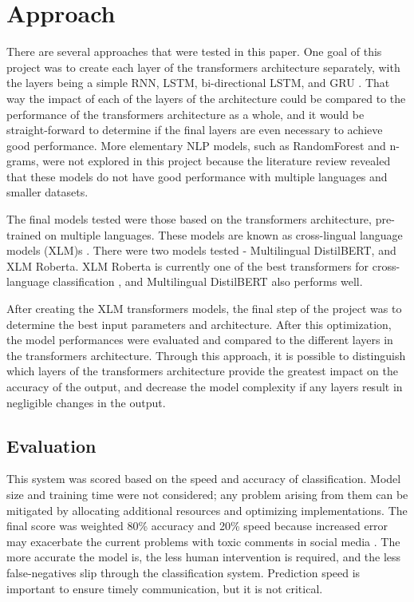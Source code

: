 \documentclass{article}
\begin{document}
\section{Approach}

There are several approaches that were tested in this paper. One goal of this project was to create each layer of the transformers architecture separately, with the layers being a simple RNN, LSTM, bi-directional LSTM, and GRU \cite{lample2019crosslingual}. That way the impact of each of the layers of the architecture could be compared to the performance of the transformers architecture as a whole, and it would be straight-forward to determine if the final layers are even necessary to achieve good performance. More elementary NLP models, such as RandomForest and n-grams, were not explored in this project because the literature review revealed that these models do not have good performance with multiple languages and smaller datasets.

The final models tested were those based on the transformers architecture, pre-trained on multiple languages. These models are known as cross-lingual language models (XLM)s \cite{lample2019crosslingual}. There were two models tested - Multilingual DistilBERT, and XLM Roberta. XLM Roberta is currently one of the best transformers for cross-language classification \cite{deep_learning_approaches}, and Multilingual DistilBERT also performs well.

After creating the XLM transformers models, the final step of the project was to determine the best input parameters and architecture. After this optimization, the model performances were evaluated and compared to the different layers in the transformers architecture. Through this approach, it is possible to distinguish which layers of the transformers architecture provide the greatest impact on the accuracy of the output, and decrease the model complexity if any layers result in negligible changes in the output.

\subsection{Evaluation}

This system was scored based on the speed and accuracy of classification. Model size and training time were not considered; any problem arising from them can be mitigated by allocating additional resources and optimizing implementations. The final score was weighted 80\% accuracy and 20\% speed because increased error may exacerbate the current problems with toxic comments in social media \cite{10.1145/3200947.3208069}. The more accurate the model is, the less human intervention is required, and the less false-negatives slip through the classification system. Prediction speed is important to ensure timely communication, but it is not critical.
\end{document}
